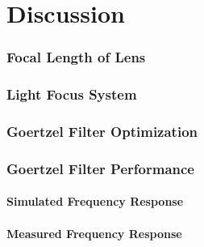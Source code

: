 \chapter{Discussion}
\label{ch_discussion}




\subsection{Focal Length of Lens}


\subsection{Light Focus System}


\subsection{Goertzel Filter Optimization}


\subsection{Goertzel Filter Performance}

\subsubsection{Simulated Frequency Response}




\subsubsection{Measured Frequency Response}


